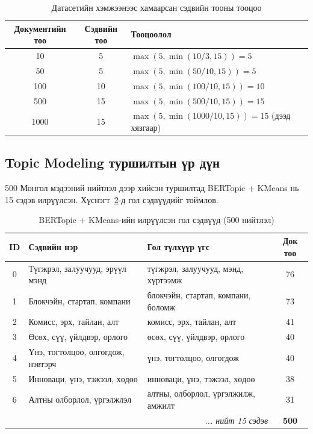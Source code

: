 \begin{table}[h!]
\centering
\renewcommand{\arraystretch}{1.3}
\caption{Датасетийн хэмжээнээс хамаарсан сэдвийн тооны тооцоо}
\label{tab:topic_cluster_count}
\begin{tabular}{|c|c|l|}
\hline
\textbf{Документийн тоо} & \textbf{Сэдвийн тоо} & \textbf{Тооцоолол} \\ \hline
10 & 5 & $\max(5, \min(10/3, 15)) = 5$ \\ \hline
50 & 5 & $\max(5, \min(50/10, 15)) = 5$ \\ \hline
100 & 10 & $\max(5, \min(100/10, 15)) = 10$ \\ \hline
500 & 15 & $\max(5, \min(500/10, 15)) = 15$ \\ \hline
1000 & 15 & $\max(5, \min(1000/10, 15)) = 15$ (дээд хязгаар) \\ \hline
\end{tabular}
\end{table}

\subsection{Topic Modeling туршилтын үр дүн}

500 Монгол мэдээний нийтлэл дээр хийсэн туршилтад BERTopic + KMeans нь 15 сэдэв илрүүлсэн. Хүснэгт~\ref{tab:bertopic_results}-д гол сэдвүүдийг тоймлов.

\begin{table}[h!]
\centering
\renewcommand{\arraystretch}{1.4}
\begin{tabular}{|c|p{5cm}|p{5cm}|c|}
\hline
\textbf{ID} & \textbf{Сэдвийн нэр} & \textbf{Гол түлхүүр үгс} & \textbf{Док тоо} \\ \hline
0 & Түгжрэл, залуучууд, эрүүл мэнд & түгжрэл, залуучууд, мэнд, хүртээмж & 76 \\ \hline
1 & Блокчэйн, стартап, компани & блокчэйн, стартап, компани, боломж & 73 \\ \hline
2 & Комисс, эрх, тайлан, алт & комисс, эрх, тайлан, алт & 41 \\ \hline
3 & Өсөх, сүү, үйлдвэр, орлого & өсөх, сүү, үйлдвэр, орлого & 40 \\ \hline
4 & Үнэ, тогтолцоо, олгогдож, нэвтэрч & үнэ, тогтолцоо, олгогдож & 40 \\ \hline
5 & Инноваци, үнэ, тэжээл, хөдөө & инноваци, үнэ, тэжээл, хөдөө & 38 \\ \hline
6 & Алтны олборлол, үргэлжлэл & алтны, олборлол, үргэлжилж, амжилт & 31 \\ \hline
\multicolumn{3}{|r|}{\textit{... нийт 15 сэдэв}} & \textbf{500} \\ \hline
\end{tabular}
\caption{BERTopic + KMeans-ийн илрүүлсэн гол сэдвүүд (500 нийтлэл)}
\label{tab:bertopic_results}
\end{table}

